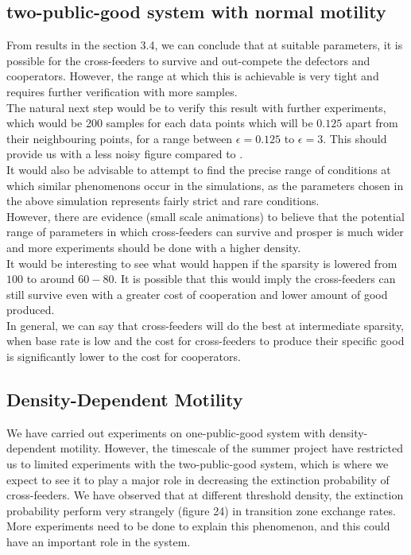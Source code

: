 \documentclass[11pt]{article}
\begin{document}
\subsection{two-public-good system with normal motility}
From results in the section 3.4, we can conclude that at suitable parameters, it is possible for the cross-feeders to survive and out-compete the defectors and cooperators. However, the range at which this is achievable is very tight and requires further verification with more samples.\\
The natural next step would be to verify this result with further experiments, which would be 200 samples for each data points which will be $0.125$ apart from their neighbouring points, for a range between $\epsilon=0.125$ to $\epsilon=3$. This should provide us with a less noisy figure compared to .\\
It would also be advisable to attempt to find the precise range of conditions at which similar phenomenons occur in the simulations, as the parameters chosen in the above simulation represents fairly strict and rare conditions.\\ However, there are evidence (small scale animations) to believe that the potential range of parameters in which cross-feeders can survive and prosper is much wider and more experiments should be done with a higher density.\\
It would be interesting to see what would happen if the sparsity is lowered from $100$ to around $60-80$. It is possible that this would imply the cross-feeders can still survive even with a greater cost of cooperation and lower amount of good produced.\\
In general, we can say that cross-feeders will do the best at intermediate sparsity, when base rate is low and the cost for cross-feeders to produce their specific good is significantly lower to the cost for cooperators.

\subsection{Density-Dependent Motility}
We have carried out experiments on one-public-good system with density-dependent motility. However, the timescale of the summer project have restricted us to limited experiments with the two-public-good system, which is where we expect to see it to play a major role in decreasing the extinction probability of cross-feeders. We have observed that at different threshold density, the extinction probability perform very strangely (figure 24) in transition zone exchange rates. More experiments need to be done to explain this phenomenon, and this could have an important role in the system.
\end{document}
